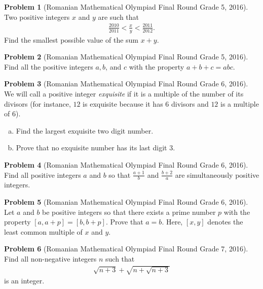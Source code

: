 \documentclass[]{article}
\theoremstyle{definition}
\newtheorem{problem}{Problem}
\begin{document}
\begin{problem}[Romanian Mathematical Olympiad Final Round Grade 5, 2016]
	Two positive integers $x$ and $y$ are such that
		\begin{align*}
			\frac{2010}{2011} < \frac{x}{y} < \frac{2011}{2012}.
		\end{align*}
	Find the smallest possible value of the sum $x + y$.
\end{problem}


\begin{problem}[Romanian Mathematical Olympiad Final Round Grade 5, 2016]
	Find all the positive integers $a, b$, and $c$ with the property $a + b + c = abc$.
\end{problem}



\begin{problem}[Romanian Mathematical Olympiad Final Round Grade 6, 2016]
	We will call a positive integer \textit{exquisite} if it is a multiple of the number of its divisors (for instance, $12$ is exquisite because it has $6$ divisors and $12$ is a multiple	of $6$).
		\begin{enumerate}[(a)]
			\item Find the largest exquisite two digit number.
			\item Prove that no exquisite number has its last digit $3$.
		\end{enumerate}
\end{problem}



\begin{problem}[Romanian Mathematical Olympiad Final Round Grade 6, 2016]
	Find all positive integers $a$ and $b$ so that $\frac{a + 1}{b}$ and $\frac{b+2}{a}$ are simultaneously positive integers.
\end{problem}



\begin{problem}[Romanian Mathematical Olympiad Final Round Grade 6, 2016]
	Let $a$ and $b$ be positive integers so that there exists a prime number $p$ with the property $[a, a + p] = [b, b + p]$. Prove that $a = b$. Here, $[x, y]$ denotes the least common multiple of $x$ and $y$.
\end{problem}



\begin{problem}[Romanian Mathematical Olympiad Final Round Grade 7, 2016]
	Find all non-negative integers $n$ such that
		\begin{align*}
			\sqrt{n+3} + \sqrt{n+\sqrt{n+3}}
		\end{align*}
	is an integer.
\end{problem}
\end{document}
